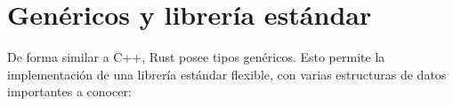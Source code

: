 \section{Genéricos y librería estándar}

De forma similar a C++, Rust posee tipos genéricos. Esto permite la
implementación de una librería estándar flexible, con varias estructuras de
datos importantes a conocer:




